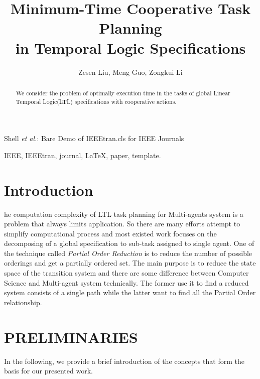 \documentclass[journal]{IEEEtran}
\begin{document}
\title{Minimum-Time Cooperative Task Planning\\ in Temporal Logic Specifications }


\author{Zesen Liu, Meng Guo, Zongkui Li}

%
{Shell \MakeLowercase{\textit{et al.}}: Bare Demo of IEEEtran.cls for IEEE Journals}
\maketitle

\begin{abstract}
We consider the problem of optimally execution time in the tasks of global Linear Temporal Logic(LTL) specifications with cooperative actions.
\end{abstract}

\begin{IEEEkeywords}
IEEE, IEEEtran, journal, \LaTeX, paper, template.
\end{IEEEkeywords}

\IEEEpeerreviewmaketitle



\section{Introduction}
he computation complexity of LTL task planning for Multi-agents system is a problem that always limits application. 
So there are many efforts attempt to simplify computational process and most existed work focuses on the decomposing of a global specification to sub-task assigned to single agent. One of the technique called \emph{Partial Order Reduction} is to reduce the number of possible orderings and get a partially ordered set. The main purpose is to reduce the state space of the transition system and there are some difference between Computer Science and Multi-agent system technically. The former use it to find a reduced system consists of a single path while the latter want to find all the Partial Order relationship.
\section{PRELIMINARIES}
In the following, we provide a brief introduction of the concepts that form the basis for our presented work. 
\end{document}
